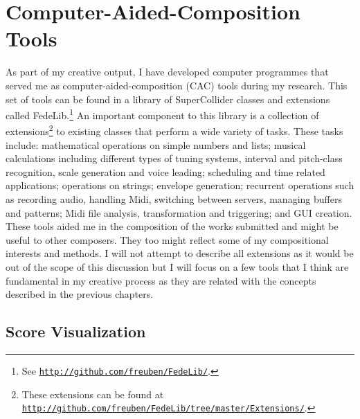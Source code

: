 \hypertarget{compueraided}{}
\section{Computer-Aided-Composition Tools}

As part of my creative output, I have developed computer programmes that served me as computer-aided-composition (CAC) tools during my research. This set of tools can be found in a library of  SuperCollider classes and extensions called FedeLib.\footnote{See \href{http://github.com/freuben/FedeLib/}{\texttt{http://github.com/freuben/FedeLib/}}.} An important component to this library is a collection of extensions\footnote{These extensions can be found at \href{http://github.com/freuben/FedeLib/tree/master/Extensions/}{\texttt{http://github.com/freuben/FedeLib/tree/master/Extensions/}}.} to existing classes that perform a wide variety of tasks. These tasks include: mathematical operations on simple numbers and lists; musical calculations including different types of tuning systems, interval and pitch-class recognition, scale generation and voice leading; scheduling and time related applications; operations on strings; envelope generation; recurrent operations such as recording audio, handling Midi, switching between servers, managing buffers and patterns; Midi file analysis, transformation and triggering; and GUI creation. These tools aided me in the composition of the works submitted and might be useful to other composers. They too might reflect some of my compositional interests and methods. I will not attempt to describe all extensions as it would be out of the scope of this discussion but I will focus on a few tools that I think are fundamental in my creative process as they are related with the concepts described in the previous chapters.

\subsection{Score Visualization}
\hypertarget{scorevisual}{}

